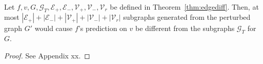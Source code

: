 \begin{theorem}
\label{thm:nodediff}
Let $f, v, G, \mathcal{G}_T, \mathcal{E}_+, \mathcal{E}_-, {\mathcal{V}_+}, {\mathcal{V}_-}, \mathcal{V}_{r}$ be defined in Theorem~\ref{thm:edgediff}.
Then, at most $|\mathcal{E}_+|+|\mathcal{E}_-| + |{\mathcal{V}_+}| + |{\mathcal{V}_-}| + |{\mathcal{V}_r}|$ subgraphs generated from the perturbed graph $G'$ would cause $f$'s prediction on $v$ be different from the subgraphs $\mathcal{G}_T$ for $G$.  

\end{theorem}
\begin{proof}
See Appendix xx.  
\end{proof}





